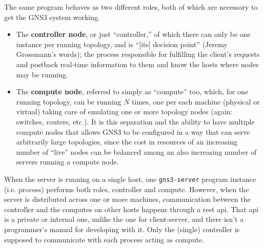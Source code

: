 The same program behaves as two different roles, both of which are necessary to get the GNS3 system working.

\begin{itemize}
	\item The \textbf{controller node}, or just ``controller,'' of which there can only be one instance per running topology, and is ``[its] decision point'' (Jeremy Grossmann's words); the process responsible for fulfilling the client's requests and postback real-time information to them and know the hosts where nodes may be running.
	\item The \textbf{compute node}, referred to simply as ``compute'' too, which, for one running topology, can be running $N$ times, one per each machine (physical or virtual) taking care of emulating one or more topology nodes (again: switches, routers, etc.).
	It is this separation and the ability to have multiple compute nodes that allows GNS3 to be configured in a way that can serve arbitrarily large topologies, since the cost in resources of an increasing number of ``live'' nodes can be balanced among an also increasing number of servers running a compute node.
\end{itemize}

When the server is running on a single host, one \texttt{gns3-server} program instance (i.e. process) performs both roles, controller and compute.
However, when the server is distributed across one or more machines, communication between the controller and the computes on other hosts happens through a \gls{rest} \gls{api}.
That \gls{api} is a private or internal one, unlike the one for client-server, and there isn't a programmer's manual for developing with it.
Only the (single) controller is supposed to communicate with each process acting as compute.

